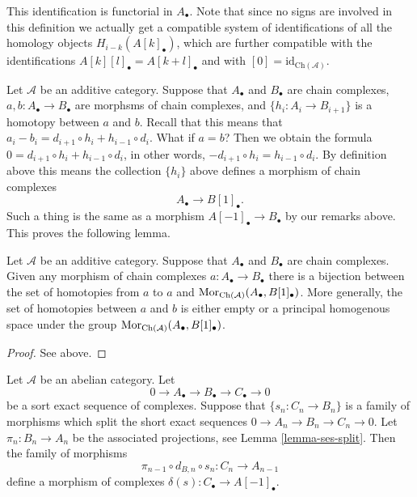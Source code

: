 \noindent
This identification is functorial in $A_\bullet$.
Note that since no signs are involved in this
definition we actually get a compatible system
of identifications of all the homology
objects $H_{i - k}(A[k]_\bullet)$, which are
further compatible with the identifications
$A[k][l]_\bullet = A[k + l]_\bullet$ and
with $[0] = \text{id}_{\text{Ch}(\mathcal{A})}$.

\medskip\noindent
Let $\mathcal{A}$ be an additive category.
Suppose that $A_\bullet$ and $B_\bullet$ are
chain complexes, $a, b : A_\bullet \to B_\bullet$ are
morphsms of chain complexes, and $\{h_i : A_i \to B_{i + 1}\}$
is a homotopy between $a$ and $b$. Recall that this means
that
$a_i - b_i = d_{i + 1} \circ h_i + h_{i - 1} \circ d_i$.
What if $a = b$? Then we obtain the formula
$0 = d_{i + 1} \circ h_i + h_{i - 1} \circ d_i$,
in other words, $ - d_{i + 1} \circ h_i = h_{i - 1} \circ d_i$.
By definition above this means the collection $\{h_i\}$
above defines a morphism of chain complexes
$$
A_\bullet \longrightarrow B[1]_\bullet.
$$
Such a thing is the same as a morphism $A[-1]_\bullet \to B_\bullet$
by our remarks above. This proves the following lemma.

\begin{lemma}
\label{lemma-homotopy-shift}
Let $\mathcal{A}$ be an additive category.
Suppose that $A_\bullet$ and $B_\bullet$ are
chain complexes. Given any morphism of chain
complexes $a : A_\bullet \to B_\bullet$ there
is a bijection between the set of homotopies
from $a$ to $a$ and
$\mathop{\rm Mor}\nolimits_{\text{Ch}(\mathcal{A})}(A_\bullet, B[1]_\bullet)$.
More generally, the set of homotopies between
$a$ and $b$ is either empty or a principal homogenous
space under the group
$\mathop{\rm Mor}\nolimits_{\text{Ch}(\mathcal{A})}(A_\bullet, B[1]_\bullet)$.
\end{lemma}

\begin{proof}
See above.
\end{proof}

\begin{lemma}
\label{lemma-ses-termwise-split}
Let $\mathcal{A}$ be an abelian category.
Let
$$
0 \to A_\bullet \to B_\bullet \to C_\bullet \to 0
$$
be a sort exact sequence of complexes.
Suppose that $\{s_n : C_n \to B_n\}$ is a family
of morphisms which split the short exact sequences
$0 \to A_n \to B_n \to C_n \to 0$. Let
$\pi_n : B_n \to A_n$ be the associated
projections, see Lemma \ref{lemma-ses-split}.
Then the family of morphisms
$$
\pi_{n - 1} \circ d_{B, n} \circ s_n
:
C_n \to A_{n - 1}
$$
define a morphism of complexes $\delta(s) : C_\bullet \to A[-1]_\bullet$.
\end{lemma}

